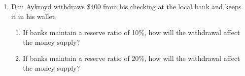 \documentclass{article}
\begin{document}
\begin{enumerate}
\begin{enumerate}
	\item If banks maintain a reserve ratio of 10\%, how will the local bank respond to the new deposit? 
	
	\item If every time the bank made a loan, the loan resulted in a new bank deposit equal to the amount of the loan, how much would the money supply in the economy expand in total?
	
	\item If banks instead maintained a reserve ratio of 5\%, how much would the money supply expand? 
	
	\end{enumerate}
	
\item Dan Aykroyd withdraws \$400 from his checking at the local bank and keeps it in his wallet.

	\begin{enumerate}
	
	\item If banks maintain a reserve ratio of 10\%, how will the withdrawal affect the money supply?
	
	\item If banks maintain a reserve ratio of 20\%, how will the withdrawal affect the money supply?
	
	\end{enumerate}

	\end{enumerate}
\end{document}
